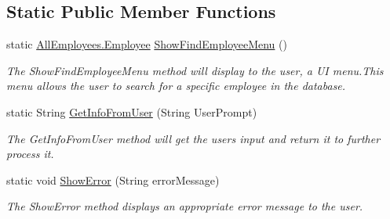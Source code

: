 \subsection*{Static Public Member Functions}
\begin{DoxyCompactItemize}
\item 
static \hyperlink{class_all_employees_1_1_employee}{All\+Employees.\+Employee} \hyperlink{class_presentation_1_1_u_i_menu_a02eeec49ff4b872dd3a2cc919ea958c1}{Show\+Find\+Employee\+Menu} ()
\begin{DoxyCompactList}\small\item\em The Show\+Find\+Employee\+Menu method will display to the user, a U\+I menu.\+This menu allows the user to search for a specific employee in the database. \end{DoxyCompactList}\item 
static String \hyperlink{class_presentation_1_1_u_i_menu_a501cb74c71850dc68b255ff502449031}{Get\+Info\+From\+User} (String User\+Prompt)
\begin{DoxyCompactList}\small\item\em The Get\+Info\+From\+User method will get the users input and return it to further process it. \end{DoxyCompactList}\item 
static void \hyperlink{class_presentation_1_1_u_i_menu_a8e46eecdb65e045345059e8a8a44c216}{Show\+Error} (String error\+Message)
\begin{DoxyCompactList}\small\item\em The Show\+Error method displays an appropriate error message to the user. \end{DoxyCompactList}\end{DoxyCompactItemize}
